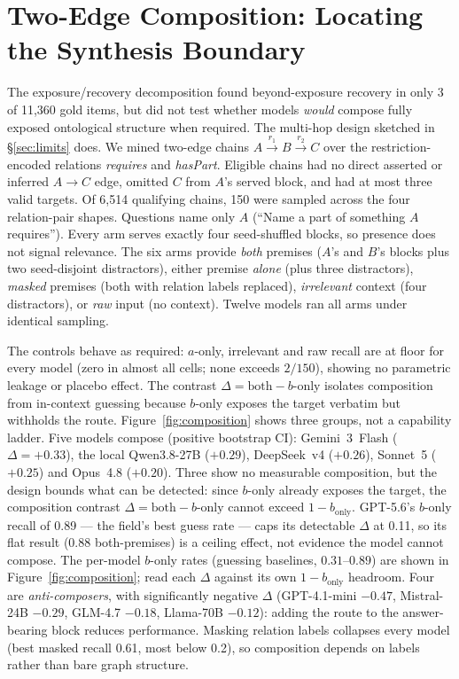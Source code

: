 \documentclass[10pt,twocolumn]{article}
\begin{document}
\section{Two-Edge Composition: Locating the Synthesis Boundary}\label{sec:composition}
The exposure/recovery decomposition found beyond-exposure recovery in only 3 of 11{,}360
gold items, but did not test whether models \emph{would} compose fully exposed ontological
structure when required. The multi-hop design sketched in \S\ref{sec:limits} does. We mined
two-edge chains $A\!\xrightarrow{r_1}\!B\!\xrightarrow{r_2}\!C$ over the restriction-encoded
relations \emph{requires} and \emph{hasPart}. Eligible chains had no direct asserted or inferred
$A\!\to\!C$ edge, omitted $C$ from $A$'s served block, and had at most three valid targets.
Of 6{,}514 qualifying chains, 150 were sampled across the four relation-pair shapes. Questions
name only $A$ (``Name a part of something $A$ requires''). Every arm serves exactly four
seed-shuffled blocks, so presence does not signal relevance. The six arms provide \emph{both}
premises ($A$'s and $B$'s blocks plus two seed-disjoint distractors), either premise
\emph{alone} (plus three distractors), \emph{masked} premises (both with relation labels
replaced), \emph{irrelevant} context (four distractors), or \emph{raw} input (no context).
Twelve models ran all arms under identical sampling.

The controls behave as required: $a$-only, irrelevant and raw recall are at floor for every
model (zero in almost all cells; none exceeds $2/150$), showing no parametric leakage or placebo
effect. The contrast $\Delta=\text{both}-b\text{-only}$ isolates composition from in-context
guessing because $b$-only exposes the target verbatim but withholds the route.
Figure~\ref{fig:composition} shows three groups, not a capability ladder. Five models compose
(positive bootstrap CI): Gemini~3~Flash ($\Delta=+0.33$), the local Qwen3.8-27B ($+0.29$),
DeepSeek~v4 ($+0.26$), Sonnet~5 ($+0.25$) and Opus~4.8 ($+0.20$). Three show no measurable
composition, but the design bounds what can be detected: since $b$-only already exposes the
target, the composition contrast $\Delta=\text{both}-b\text{-only}$ cannot exceed $1-b_{\text{only}}$.
GPT-5.6's $b$-only recall of 0.89 --- the field's best guess rate --- caps its detectable $\Delta$
at 0.11, so its flat result (0.88 both-premises) is a ceiling effect, not evidence the model
cannot compose. The per-model $b$-only rates (guessing baselines, $0.31$--$0.89$) are shown in
Figure~\ref{fig:composition}; read each $\Delta$ against its own $1-b_{\text{only}}$ headroom.
Four are \emph{anti-composers}, with significantly
negative $\Delta$ (GPT-4.1-mini $-0.47$, Mistral-24B $-0.29$, GLM-4.7 $-0.18$, Llama-70B
$-0.12$): adding the route to the answer-bearing block reduces performance. Masking relation
labels collapses every model (best masked recall 0.61, most below 0.2), so composition depends
on labels rather than bare graph structure.
\end{document}
